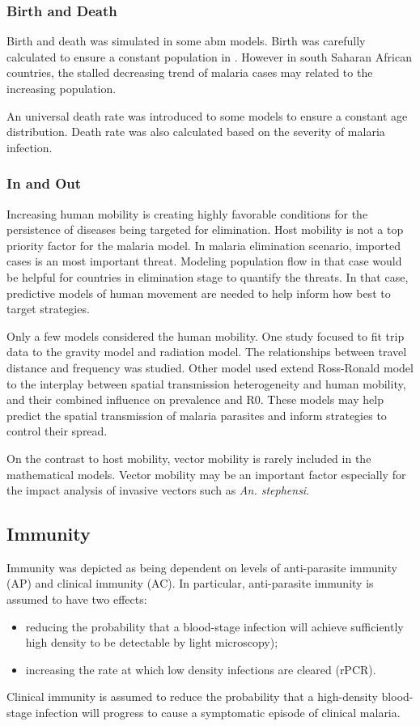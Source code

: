 \documentclass[a4paper, 12pt, twoside]{article}
\begin{document}
\subsubsection{Birth and Death}
Birth and death was simulated in some \gls{abm} models.
Birth was carefully calculated to ensure a constant population in .
However in south Saharan African countries, the stalled decreasing trend of malaria cases may related to the increasing population.

An universal death rate was introduced to some models  to ensure a constant age distribution. Death rate was also calculated based on the severity of malaria infection.

\subsubsection{In and Out}
Increasing human mobility is creating highly favorable conditions for the persistence of diseases being targeted for elimination.
Host mobility is not a top priority factor for the malaria model.
In malaria elimination scenario, imported cases is an most important threat.
Modeling population flow in that case would be helpful for countries in elimination stage to quantify the threats.
In that case, predictive models of human movement are needed to help inform how best to target strategies.

Only a few models\cite{Zhu2015a} considered the human mobility.
One study focused to fit trip data to the gravity model and radiation model\cite{Marshall2018}.
The relationships between travel distance and frequency was studied.
Other model\cite{acevedo_spatial_2015} used extend Ross-Ronald model to the interplay between spatial transmission heterogeneity and human mobility, and their combined influence on prevalence and \gls{R0}.
These models may help predict the spatial transmission of malaria parasites and inform strategies to control their spread.

On the contrast to host mobility, vector mobility is rarely included in the mathematical models.
Vector mobility may be an important factor especially for the impact analysis of invasive vectors such as \textit{An. stephensi}.

\subsection{Immunity}

Immunity was depicted as being dependent on levels of anti-parasite immunity (AP) and clinical immunity (AC).
In particular, anti-parasite immunity is assumed to have two effects:
\begin{itemize}
	\item reducing the probability that a blood-stage infection will achieve sufficiently high density to be detectable by light microscopy);
	\item increasing the rate at which low density infections are cleared (rPCR).
\end{itemize}
Clinical immunity is assumed to reduce the probability that a high-density blood-stage infection will progress to cause a symptomatic episode of clinical malaria.
\end{document}
